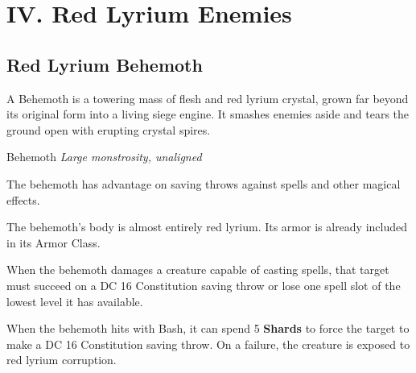 \documentclass[letterpaper,twocolumn,openany,nodeprecatedcode,breakable,skins,xparse,most]{dndbook}
\begin{document}
\section{IV. Red Lyrium Enemies}

\subsection{Red Lyrium Behemoth}

A Behemoth is a towering mass of flesh and red lyrium crystal, grown far beyond its original form into a living siege engine. It smashes enemies aside and tears the ground open with erupting crystal spires.

\begin{monsterbox}{Behemoth}
\textit{Large monstrosity, unaligned}\\
\rpghline
\basics[
  armorclass = 10 (lyrium hide),
  hitpoints = 120,
  speed = 35 ft.
]
\rpghline
\stats[
  STR = \stat{26},
  DEX = \stat{10},
  CON = \stat{26},
  INT = \stat{8},
  WIS = \stat{12},
  CHA = \stat{8}
]
\rpghline
\details[
  skills = Athletics +10,
  senses = passive Perception 11,
  languages = understands Common but can't speak,
  challenge = 10
]
\rpghline

\begin{rpg-monsteraction}
The behemoth has advantage on saving throws against spells and other magical effects.
\end{rpg-monsteraction}

\begin{rpg-monsteraction}
The behemoth's body is almost entirely red lyrium. Its armor is already included in its Armor Class.
\end{rpg-monsteraction}

\begin{rpg-monsteraction}
When the behemoth damages a creature capable of casting spells, that target must succeed on a DC 16 Constitution saving throw or lose one spell slot of the lowest level it has available.
\end{rpg-monsteraction}

\begin{rpg-monsteraction}
When the behemoth hits with Bash, it can spend 5 \textbf{Shards} to force the target to make a DC 16 Constitution saving throw. On a failure, the creature is exposed to red lyrium corruption.
\end{rpg-monsteraction}


\end{monsterbox}
\end{document}
